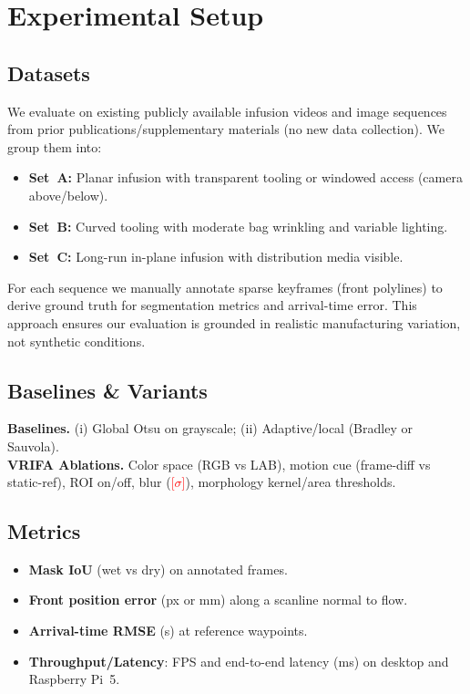 \documentclass[twocolumn, 10pt]{article}
\newcommand{\placeholder}[1]{\textcolor{red}{[#1]}}
\begin{document}
\section{Experimental Setup}
\subsection{Datasets}
We evaluate on existing publicly available infusion videos and image sequences from prior publications/supplementary materials (no new data collection). We group them into:
\begin{itemize}[leftmargin=*,noitemsep]
  \item \textbf{Set~A:} Planar infusion with transparent tooling or windowed access (camera above/below).
  \item \textbf{Set~B:} Curved tooling with moderate bag wrinkling and variable lighting.
  \item \textbf{Set~C:} Long-run in-plane infusion with distribution media visible.
\end{itemize}
For each sequence we manually annotate sparse keyframes (front polylines) to derive ground truth for segmentation metrics and arrival-time error. This approach ensures our evaluation is grounded in realistic manufacturing variation, not synthetic conditions.

\subsection{Baselines \& Variants}
\textbf{Baselines.} (i) Global Otsu on grayscale; (ii) Adaptive/local (Bradley or Sauvola). \\
\textbf{VRIFA Ablations.} Color space (RGB vs LAB), motion cue (frame-diff vs static-ref), ROI on/off, blur (\placeholder{$\sigma$}), morphology kernel/area thresholds.

\subsection{Metrics}
\begin{itemize}[leftmargin=*,noitemsep]
  \item \textbf{Mask IoU} (wet vs dry) on annotated frames.
  \item \textbf{Front position error} (px or mm) along a scanline normal to flow.
  \item \textbf{Arrival-time RMSE} (s) at reference waypoints.
  \item \textbf{Throughput/Latency}: FPS and end-to-end latency (ms) on desktop and Raspberry Pi~5.
\end{itemize}
\end{document}
